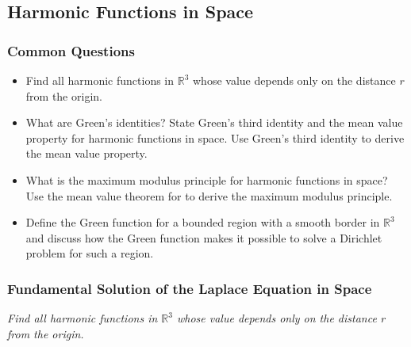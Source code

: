 \documentclass[11pt, a4paper]{article}
\newcommand{\question}[1]{\textit{#1}\vspace{2mm}}
\newcommand{\R}{\mathbb{R}} %
\begin{document}
\subsection{Harmonic Functions in Space}
\subsubsection{Common Questions}
\begin{itemize}

	\item Find all harmonic functions in $ \R^{3} $ whose value depends only on the distance $ r $ from the origin.
		
	\item What are Green's identities? State Green's third identity and the mean value property for harmonic functions in space. Use Green's third identity to derive the mean value property.
	
	\item What is the maximum modulus principle for harmonic functions in space? Use the mean value theorem for to derive the maximum modulus principle.
	
	\item Define the Green function for a bounded region with a smooth border in $ \R^{3} $ and discuss how the Green function makes it possible to solve a Dirichlet problem for such a region.
	
\end{itemize}


\subsubsection{Fundamental Solution of the Laplace Equation in Space}
\question{Find all harmonic functions in $ \R^{3} $ whose value depends only on the distance $ r $ from the origin.}
\end{document}
